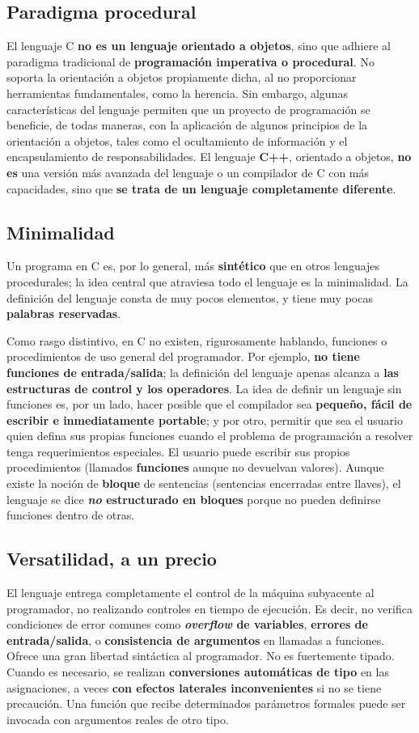 \subsection{Paradigma procedural}
El lenguaje C \textbf{no es un lenguaje orientado a objetos}, sino que
adhiere al paradigma tradicional de \textbf{programación imperativa o procedural}. No
soporta la orientación a objetos propiamente dicha, al no
proporcionar herramientas fundamentales, como la herencia. Sin embargo,
algunas características del lenguaje permiten que un proyecto de
programación se beneficie, de todas maneras, con la aplicación de
algunos principios de la orientación a objetos, tales como el
ocultamiento de información y el encapsulamiento de
responsabilidades. El lenguaje \textbf{C++}, orientado a objetos, \textbf{no es}
una versión más avanzada del lenguaje o un compilador de C con
más capacidades, sino que \textbf{se trata de un lenguaje completamente
diferente}. 


\subsection{Minimalidad}
Un programa en C es, por lo general, más \textbf{sintético} que en otros
lenguajes procedurales; la idea central que atraviesa todo
el lenguaje es la minimalidad. La definición del lenguaje consta de
muy pocos elementos, y tiene muy pocas \textbf{palabras reservadas}. 

Como rasgo distintivo, en C no existen, rigurosamente hablando, funciones o
procedimientos de uso general del programador. Por ejemplo, \textbf{no tiene
funciones de entrada/salida}; la definición del lenguaje apenas
alcanza a \textbf{las estructuras de control y los operadores}. La idea de
definir un lenguaje sin funciones es, por un lado, hacer posible que el
compilador sea \textbf{pequeño, fácil de escribir e inmediatamente
portable}; y por otro, permitir que sea el usuario quien defina sus
propias funciones cuando el problema de programación a resolver tenga
requerimientos especiales. El usuario puede escribir sus propios procedimientos (llamados
\textbf{funciones} aunque no devuelvan valores). Aunque existe la
noción de \textbf{bloque} de sentencias (sentencias encerradas entre llaves), el lenguaje se dice \textbf{\textit{no}
estructurado en bloques} porque no pueden definirse funciones dentro de
otras. 

\subsection{Versatilidad, a un precio}
El lenguaje entrega completamente el control de la máquina subyacente
al programador, no realizando controles en tiempo de ejecución. Es
decir, no verifica condiciones de error comunes como \textbf{\textit{overflow}
de variables}, \textbf{errores de entrada/salida}, o \textbf{consistencia de argumentos}
en llamadas a funciones. Ofrece una gran libertad sintáctica al programador. No
es fuertemente tipado. Cuando es necesario, se realizan \textbf{conversiones
automáticas de tipo} en las asignaciones, a veces \textbf{con efectos
laterales inconvenientes} si no se tiene precaución. Una función que
recibe determinados parámetros formales puede ser invocada con
argumentos reales de otro tipo. 

